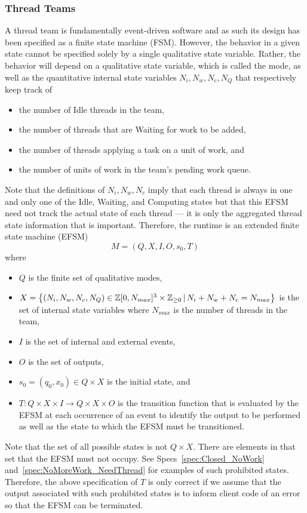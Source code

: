 \documentclass{article}
\newcommand{\Z}                 {{\mathbb Z}}
\begin{document}
\subsubsection{Thread Teams}
A thread team is fundamentally event-driven software and as such its design has
been specified as a finite state machine (FSM).  However, the behavior in a
given state cannot be specified solely by a single qualitative state variable.
Rather, the behavior will depend on a qualitative state variable, which is
called the mode, as well as the quantitative internal state variables $N_i, N_w,
N_c, N_Q$ that respectively keep track of 
\begin{itemize}
\item{the number of Idle threads in the team,}
\item{the number of threads that are Waiting for work to be added,}
\item{the number of threads applying a task on a unit of work, and}
\item{the number of units of work in the team's pending work queue.}
\end{itemize}
Note that the definitions of $N_i, N_w, N_c$ imply that each thread is
always in one and only one of the Idle, Waiting, and Computing states but that
this EFSM need not track the actual state of each thread --- it is only the
aggregated thread state information that is important.  Therefore, the runtime
is an extended finite state machine (EFSM)
\[
M = (Q, X, I, O, s_0, T)
\]
where
\begin{itemize}
\item{$Q$ is the finite set of qualitative modes,}
\item{$X = \set{(N_i, N_w, N_c, N_Q) \in \Z[0,N_{max}]^3\times\Z_{\ge 0}\,|\,N_i + N_w + N_c =
N_{max}}$ is the set of internal state variables where $N_{max}$ is the
number of threads in the team,}
\item{$I$ is the set of internal and external events,}
\item{$O$ is the set of outputs,}
\item{$s_0 = (q_0, x_0) \in Q \times X$ is the initial state, and}
\item{$T : Q \times X \times I \to Q \times X \times O$ is the transition
function that is evaluated by the EFSM at each occurrence of an event to
identify the output to be performed as well as the state to which the EFSM must
be transitioned.}
\end{itemize}

Note that the set of all possible states is not $Q \times X$.  There are
elements in that set that the EFSM must not occupy.  See
Specs~\ref{spec:Closed_NoWork} and~\ref{spec:NoMoreWork_NeedThread} for examples
of such prohibited states.  Therefore, the above specification of $T$ is only
correct if we assume that the output associated with such prohibited states is
to inform client code of an error so that the EFSM can be terminated.\\
\end{document}
